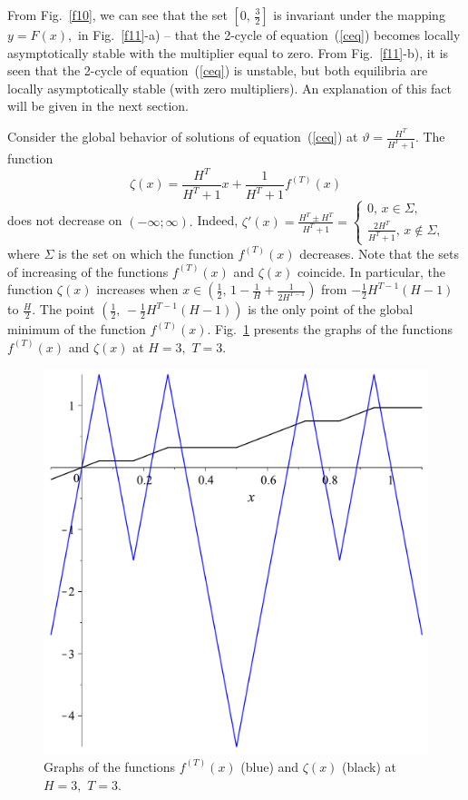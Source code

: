 \documentclass[12pt,a4paper]{amsart}
\begin{document}
From Fig.~\ref{f10}, we can see that the set $\left[ 0,\,\frac32\right]$ is invariant under the mapping $y=F(x),$ in Fig.~\ref{f11}-a) --
that the 2-cycle of equation~(\ref{ceq}) becomes locally asymptotically stable with the multiplier equal to zero. From 
Fig.~\ref{f11}-b), it is seen that the 2-cycle of equation~(\ref{ceq}) is unstable, but both equilibria are locally asymptotically stable 
(with zero multipliers). An explanation of this fact will be given in the next section.

Consider the global behavior of solutions of equation~(\ref{ceq}) at $\vartheta = \frac{H^T}{H^T+1}.$ The function 
$$
\zeta (x) = \frac{H^T}{H^T+1} x + \frac{1}{H^T+1}	f^{(T)}(x)
$$
does not decrease on $(-\infty;\infty).$ Indeed, 
$
\zeta'(x) = \frac{H^T \pm H^T}{H^T+1} =
\left\{\begin{array}{ll}
0,\,x\in \Sigma, \\
\frac{2 H^T}{H^T+1},\,x \notin\Sigma,
\end{array}\right.
$
where $\Sigma$ is the set on which the function $f^{(T)}(x)$ decreases. Note that the sets of increasing of the functions $f^{(T)}(x)$ 
and $\zeta (x)$ coincide. In particular, the function $\zeta (x)$ increases when 
$x \in \left( \frac12,\, 1-\frac{1}{H}+\frac{1}{2 H^{T-1}} \right)$ from $-\frac12 H^{T-1} (H-1)$ to $\frac{H}{2}.$ The point 
$\left( \frac12,\, -\frac12 H^{T-1} (H-1) \right)$ is the only point of the global minimum of the function $f^{(T)}(x).$ Fig.~\ref{f12} 
presents the graphs of the functions $f^{(T)}(x)$ and $\zeta (x)$ at $H=3,$ $T=3.$

\begin{figure}[h!]
\centering
\includegraphics[scale=0.28]{Fig12}
\caption{Graphs of the functions $f^{(T)}(x)$ (blue) and $\zeta (x)$ (black) at $H=3,$ $T=3.$} \label{f12}
\end{figure}
\end{document}
